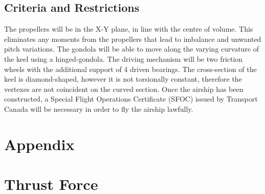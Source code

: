 \documentclass[12pt]{article}
\begin{document}
\subsection{Criteria and Restrictions}
The propellers will be in the X-Y plane, in line with the centre of volume. This eliminates any moments from the propellers that lead to imbalance and unwanted pitch variations. The gondola will be able to move along the varying curvature of the keel using a hinged-gondola. The driving mechanism will be two friction wheels with the additional support of 4 driven bearings. The cross-section of the keel is diamond-shaped, however it is not torsionally constant, therefore the vertexes are not coincident on the curved section. Once the airship has been constructed, a Special Flight Operations Certificate (SFOC) issued by Transport Canada will be necessary in order to fly the airship lawfully.

\pagebreak




\pagebreak



\section*{Appendix}
\appendix
\section{Thrust Force}
\end{document}

